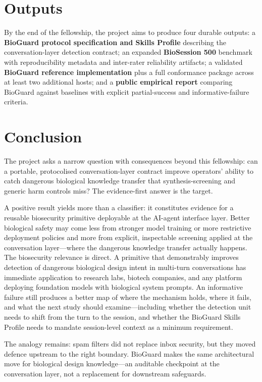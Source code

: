 \documentclass[10.5pt,a4paper]{article}
\begin{document}
\section*{Outputs}

By the end of the fellowship, the project aims to produce four durable outputs: a \textbf{BioGuard protocol specification and Skills Profile} describing the conversation-layer detection contract; an expanded \textbf{BioSession 500} benchmark with reproducibility metadata and inter-rater reliability artifacts; a validated \textbf{BioGuard reference implementation} plus a full conformance package across at least two additional hosts; and a \textbf{public empirical report} comparing BioGuard against baselines with explicit partial-success and informative-failure criteria.

\section*{Conclusion}

The project asks a narrow question with consequences beyond this fellowship: can a portable, protocolised conversation-layer contract improve operators' ability to catch dangerous biological knowledge transfer that synthesis-screening and generic harm controls miss? The evidence-first answer is the target.

A positive result yields more than a classifier: it constitutes evidence for a reusable biosecurity primitive deployable at the AI-agent interface layer. Better biological safety may come less from stronger model training or more restrictive deployment policies and more from explicit, inspectable screening applied at the conversation layer---where the dangerous knowledge transfer actually happens. The biosecurity relevance is direct. A primitive that demonstrably improves detection of dangerous biological design intent in multi-turn conversations has immediate application to research labs, biotech companies, and any platform deploying foundation models with biological system prompts. An informative failure still produces a better map of where the mechanism holds, where it fails, and what the next study should examine---including whether the detection unit needs to shift from the turn to the session, and whether the BioGuard Skills Profile needs to mandate session-level context as a minimum requirement.

The analogy remains: spam filters did not replace inbox security, but they moved defence upstream to the right boundary. BioGuard makes the same architectural move for biological design knowledge---an auditable checkpoint at the conversation layer, not a replacement for downstream safeguards.
\end{document}
